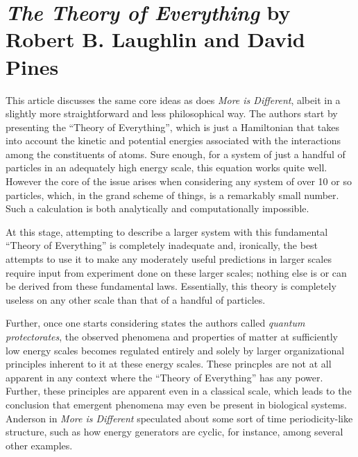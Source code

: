\section{\textit{The Theory of Everything} by Robert B. Laughlin and David Pines}

This article discusses the same core ideas as does \textit{More is Different}, albeit in a slightly more straightforward and less philosophical way. The authors start by presenting the ``Theory of Everything'', which is just a Hamiltonian that takes into account the kinetic and potential energies associated with the interactions among the constituents of atoms. Sure enough, for a system of just a handful of particles in an adequately high energy scale, this equation works quite well. However the core of the issue arises when considering any system of over 10 or so particles, which, in the grand scheme of things, is a remarkably small number. Such a calculation is both analytically and computationally impossible.

At this stage, attempting to describe a larger system with this fundamental ``Theory of Everything'' is completely inadequate and, ironically, the best attempts to use it to make any moderately useful predictions in larger scales require input from experiment done on these larger scales; nothing else is or can be derived from these fundamental laws. Essentially, this theory is completely useless on any other scale than that of a handful of particles.

Further, once one starts considering states the authors called \textit{quantum protectorates}, the observed phenomena and properties of matter at sufficiently low energy scales becomes regulated entirely and solely by larger organizational principles inherent to it at these energy scales. These princples are not at all apparent in any context where the ``Theory of Everything'' has any power. Further, these principles are apparent even in a classical scale, which leads to the conclusion that emergent phenomena may even be present in biological systems. Anderson in \textit{More is Different} speculated about some sort of time periodicity-like structure, such as how energy generators are cyclic, for instance, among several other examples.






